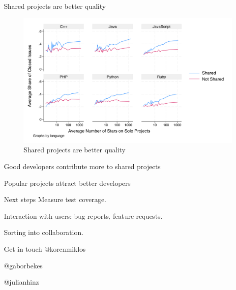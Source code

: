 \documentclass[
  ignorenonframetext,
  aspectratio=1610,
]{beamer}
\begin{document}
\begin{frame}{Shared projects are better quality}
\label{shared-projects-are-better-quality}
\begin{figure}
\centering
\includegraphics{figures/avg_share_closed_by_quality.png}
\caption{Shared projects are better quality}
\end{figure}
\end{frame}

\begin{frame}{Good developers contribute more to shared projects}
\label{good-developers-contribute-more-to-shared-projects}

\end{frame}

\begin{frame}{Popular projects attract better developers}
\label{popular-projects-attract-better-developers}

\end{frame}

\begin{frame}{Next steps}
\label{next-steps}
Measure test coverage.

Interaction with users: bug reports, feature requests.

Sorting into collaboration.
\end{frame}

\begin{frame}{Get in touch}
\label{get-in-touch}
@korenmiklos

@gaborbekes

@julianhinz
\end{frame}
\end{document}
